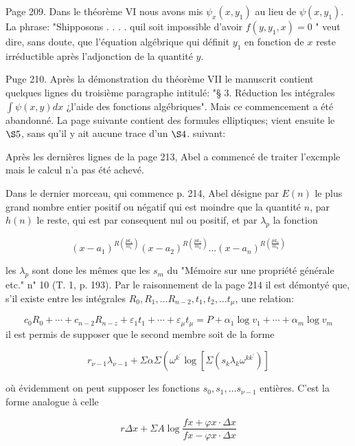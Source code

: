 \documentclass{article}
\begin{document}
Page 209. Dans le théorème VI nous avons mis \(\psi_{x}\left(x, y_{1}\right)\) au lieu de \(\psi\left(x, y_{1}\right)\). La phrase: "Shipposons . . . . quil soit impossible d'avoir \(f\left(y, y_{1}, x\right)=0\) " veut dire, sans doute, que l'équation algébrique qui définit \(y_{1}\) en fonction de \(x\) reste irréductible après l'adjonction de la quantité \(y\).

Puge 210. Après la démonstration du théorème VII le manuscrit contient quelques lignes du troisième paragraphe intitulé: "§ 3. Réduction les intégrales \(\int \psi(x, y) d x\) ¿l'aide des fonctions algébriques". Mais ce commencement a été abandonné. La page suivante contient des formules elliptiques; vient ensuite le \(\S 5\), sans qu'il y ait aucune trace d'un \(\S 4\). suivant:

Après les dernières lignes de la page 213, Abel a commencé de traiter l'excmple mais le calcul n'a pas été achevé.

Dans le dernier morceau, qui commence p. 214, Abel désigne par \(E(n)\) le plus grand nombre entier positif ou négatif qui est moindre que la quantité \(n\), par \(h(n)\) le reste, qui est par consequent nul ou positif, et par \(\lambda_{p}\) la fonction

\[
\left(x-a_{1}\right)^{R\left(\frac{p k_{1}}{m_{1}}\right)}\left(x-a_{2}\right)^{R\left(\frac{p k_{2}}{m_{2}}\right)} \ldots\left(x-a_{n}\right)^{R\left(\frac{p k_{n}}{m_{n}}\right)}
\]

les \(\lambda_{p}\) sont done les mêmes que les \(s_{m}\) du "Mémoire sur une propriété générale etc." n" 10 (T. 1, p. 193). Par le raisonnement de la page 214 il est démontyé que, s'il existe entre les intégrales \(R_{0}, R_{1}, \ldots R_{n-2}, t_{1}, t_{2}, \ldots t_{\mu}\), une relation:

\[
c_{0} R_{0}+\cdots+c_{n-2} R_{n-z}+\varepsilon_{1} t_{1}+\cdots+\varepsilon_{\mu} t_{\mu}=P+\alpha_{1} \log v_{1}+\cdots+\alpha_{m} \log v_{m}
\]
il est permis de supposer que le second membre soit de la forme

\[
r_{\nu-1} \lambda_{\nu-1}+\Sigma \alpha \Sigma\left(\omega^{k^{\prime}} \log \left[\Sigma\left(s_{k} \lambda_{k} \omega^{k k^{\prime}}\right)\right]\right.
\]

où évidemment on peut supposer les fonctions \(s_{0}, s_{1}, \ldots s_{\nu-1}\) entières. C'est la forme analogue à celle

\[
r \Delta x+\Sigma A \log \frac{f x+\varphi x \cdot \Delta x}{f x-\varphi x \cdot \Delta x}
\]
\end{document}
